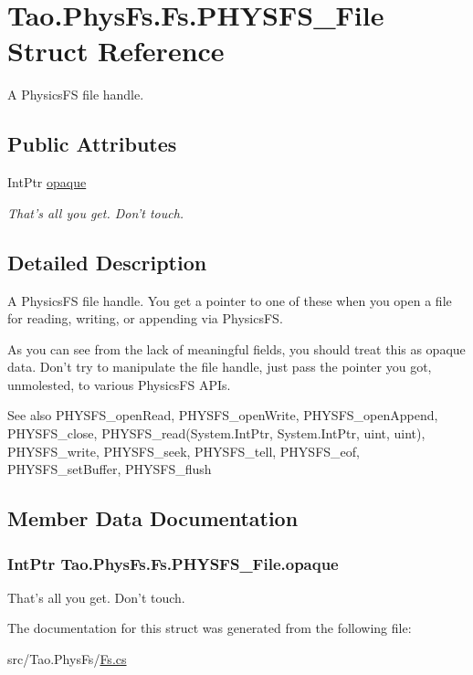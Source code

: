 \hypertarget{struct_tao_1_1_phys_fs_1_1_fs_1_1_p_h_y_s_f_s___file}{
\section{Tao.PhysFs.Fs.PHYSFS\_\-File Struct Reference}
\label{struct_tao_1_1_phys_fs_1_1_fs_1_1_p_h_y_s_f_s___file}
}


A PhysicsFS file handle.  


\subsection*{Public Attributes}
\begin{DoxyCompactItemize}
\item 
IntPtr \hyperlink{struct_tao_1_1_phys_fs_1_1_fs_1_1_p_h_y_s_f_s___file_ab77c9a54ba20f3cc02523df67fb158e8}{opaque}
\begin{DoxyCompactList}\small\item\em That's all you get. Don't touch. \item\end{DoxyCompactList}\end{DoxyCompactItemize}


\subsection{Detailed Description}
A PhysicsFS file handle. You get a pointer to one of these when you open a file for reading, writing, or appending via PhysicsFS. 

As you can see from the lack of meaningful fields, you should treat this as opaque data. Don't try to manipulate the file handle, just pass the pointer you got, unmolested, to various PhysicsFS APIs.

\begin{DoxySeeAlso}{See also}
PHYSFS\_\-openRead, PHYSFS\_\-openWrite, PHYSFS\_\-openAppend, PHYSFS\_\-close, PHYSFS\_\-read(System.IntPtr, System.IntPtr, uint, uint), PHYSFS\_\-write, PHYSFS\_\-seek, PHYSFS\_\-tell, PHYSFS\_\-eof, PHYSFS\_\-setBuffer, PHYSFS\_\-flush


\end{DoxySeeAlso}


\subsection{Member Data Documentation}
\hypertarget{struct_tao_1_1_phys_fs_1_1_fs_1_1_p_h_y_s_f_s___file_ab77c9a54ba20f3cc02523df67fb158e8}{
\subsubsection[{opaque}]{\setlength{\rightskip}{0pt plus 5cm}IntPtr {\bf Tao.PhysFs.Fs.PHYSFS\_\-File.opaque}}}
\label{struct_tao_1_1_phys_fs_1_1_fs_1_1_p_h_y_s_f_s___file_ab77c9a54ba20f3cc02523df67fb158e8}


That's all you get. Don't touch. 



The documentation for this struct was generated from the following file:\begin{DoxyCompactItemize}
\item 
src/Tao.PhysFs/\hyperlink{_fs_8cs}{Fs.cs}\end{DoxyCompactItemize}

